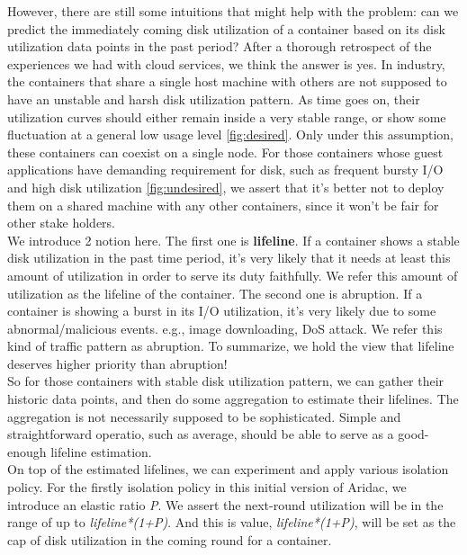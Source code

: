 \documentclass[10pt, conference,compsoc]{IEEEtran}
\begin{document}
However, there are still some intuitions that might help with the problem: can we predict the immediately coming disk utilization of a container based on its disk utilization data points in the past period? After a thorough retrospect of the experiences we had with cloud services, we think the answer is yes. In industry, the containers that share a single host machine with others are not supposed to have an unstable and harsh disk utilization pattern. As time goes on, their utilization curves should either remain inside a very stable range, or show some fluctuation at a general low usage level \ref*{fig:desired}. Only under this assumption, these containers can coexist on a single node. For those containers whose guest applications have demanding requirement for disk, such as frequent bursty I/O and high disk utilization \ref*{fig:undesired}, we assert that it's better not to deploy them on a shared machine with any other containers, since it won't be fair for other stake holders. \\

We introduce 2 notion here. The first one is \textbf{lifeline}. If a container shows a stable disk utilization in the past time period, it’s very likely that it needs at least this amount of utilization in order to serve its duty faithfully. We refer this amount of utilization as the lifeline of the container. The second one is abruption. If a container is showing a burst in its I/O utilization, it's very likely due to some abnormal/malicious events. e.g., image downloading, DoS attack. We refer this kind of traffic pattern as abruption. To summarize, we hold the view that lifeline deserves higher priority than abruption! \\

So for those containers with stable disk utilization pattern, we can gather  their historic data points, and then do some aggregation to estimate their lifelines. The aggregation is not necessarily supposed to be sophisticated. Simple and straightforward operatio, such as average, should be able to serve as a good-enough lifeline estimation. \\

On top of the estimated lifelines, we can experiment and apply various isolation policy. For the firstly isolation policy in this initial version of Aridac, we introduce an elastic ratio \textit{P}. We assert the next-round utilization will be in the range of up to \textit{lifeline*(1+P)}. And this is value, \textit{lifeline*(1+P)}, will be set as the cap of disk utilization in the coming round for a container.\\
\end{document}
